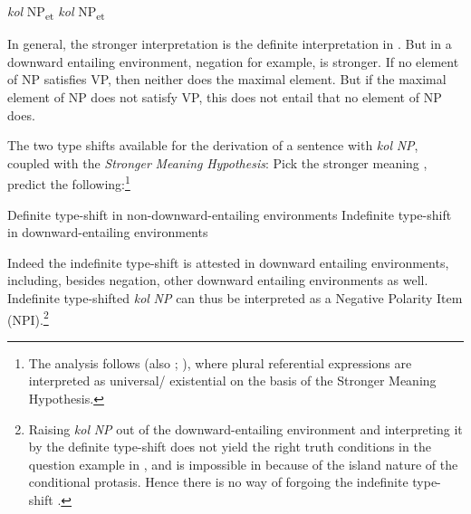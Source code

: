 \documentclass[output=paper]{langsci/langscibook}
\begin{document}
           \textit{kol}       NP\textsubscript{et}             \textit{kol}       NP\textsubscript{et}
\z{}

In general, the stronger interpretation is the definite interpretation in . But in a downward entailing environment, negation for example,  is stronger. If no element of NP satisfies VP, then neither does the maximal element. But if the maximal element of NP does not satisfy VP, this does not entail that no element of NP does. 

The two type shifts available for the derivation of a sentence with \textit{kol} \textit{NP}, coupled with the \textit{Stronger} \textit{Meaning} \textit{Hypothesis}: Pick the stronger meaning \citep{DalrympleEtAl1994}, predict the following:\footnote{\textrm{The analysis follows \citealt{Krifka1996} (also \citealt{Malamud2012}; \citealt{Spector2018}), where plural referential expressions are interpreted as universal/ existential on the basis of the Stronger Meaning Hypothesis.} } 

\ea%
    \label{ex:doron:34}
\ea Definite type-shift   in non-downward-entailing environments 
\ex Indefinite type-shift   in downward-entailing environments
\z
\z


Indeed the indefinite type-shift is attested in downward entailing environments, including, besides negation, other downward entailing environments as well. Indefinite type-shifted \textit{kol} \textit{NP} can thus be interpreted as a Negative Polarity Item (NPI).\footnote{Raising \textit{kol} \textit{NP} out of the downward-entailing environment and interpreting it by the definite type-shift  does not yield the right truth conditions in the question example in , and is impossible in  because of the island nature of the conditional protasis. Hence there is no way of forgoing the indefinite type-shift .} 
\end{document}
